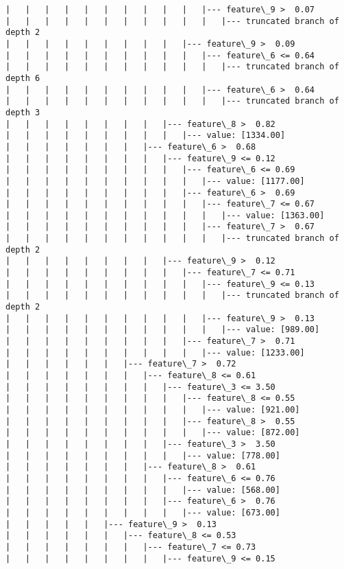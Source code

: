 \documentclass[11pt]{article}
\begin{document}
\begin{Verbatim}[commandchars=\\\{\}]
|   |   |   |   |   |   |   |   |   |   |--- feature\_9 >  0.07
|   |   |   |   |   |   |   |   |   |   |   |--- truncated branch of depth 2
|   |   |   |   |   |   |   |   |   |--- feature\_9 >  0.09
|   |   |   |   |   |   |   |   |   |   |--- feature\_6 <= 0.64
|   |   |   |   |   |   |   |   |   |   |   |--- truncated branch of depth 6
|   |   |   |   |   |   |   |   |   |   |--- feature\_6 >  0.64
|   |   |   |   |   |   |   |   |   |   |   |--- truncated branch of depth 3
|   |   |   |   |   |   |   |   |--- feature\_8 >  0.82
|   |   |   |   |   |   |   |   |   |--- value: [1334.00]
|   |   |   |   |   |   |   |--- feature\_6 >  0.68
|   |   |   |   |   |   |   |   |--- feature\_9 <= 0.12
|   |   |   |   |   |   |   |   |   |--- feature\_6 <= 0.69
|   |   |   |   |   |   |   |   |   |   |--- value: [1177.00]
|   |   |   |   |   |   |   |   |   |--- feature\_6 >  0.69
|   |   |   |   |   |   |   |   |   |   |--- feature\_7 <= 0.67
|   |   |   |   |   |   |   |   |   |   |   |--- value: [1363.00]
|   |   |   |   |   |   |   |   |   |   |--- feature\_7 >  0.67
|   |   |   |   |   |   |   |   |   |   |   |--- truncated branch of depth 2
|   |   |   |   |   |   |   |   |--- feature\_9 >  0.12
|   |   |   |   |   |   |   |   |   |--- feature\_7 <= 0.71
|   |   |   |   |   |   |   |   |   |   |--- feature\_9 <= 0.13
|   |   |   |   |   |   |   |   |   |   |   |--- truncated branch of depth 2
|   |   |   |   |   |   |   |   |   |   |--- feature\_9 >  0.13
|   |   |   |   |   |   |   |   |   |   |   |--- value: [989.00]
|   |   |   |   |   |   |   |   |   |--- feature\_7 >  0.71
|   |   |   |   |   |   |   |   |   |   |--- value: [1233.00]
|   |   |   |   |   |   |--- feature\_7 >  0.72
|   |   |   |   |   |   |   |--- feature\_8 <= 0.61
|   |   |   |   |   |   |   |   |--- feature\_3 <= 3.50
|   |   |   |   |   |   |   |   |   |--- feature\_8 <= 0.55
|   |   |   |   |   |   |   |   |   |   |--- value: [921.00]
|   |   |   |   |   |   |   |   |   |--- feature\_8 >  0.55
|   |   |   |   |   |   |   |   |   |   |--- value: [872.00]
|   |   |   |   |   |   |   |   |--- feature\_3 >  3.50
|   |   |   |   |   |   |   |   |   |--- value: [778.00]
|   |   |   |   |   |   |   |--- feature\_8 >  0.61
|   |   |   |   |   |   |   |   |--- feature\_6 <= 0.76
|   |   |   |   |   |   |   |   |   |--- value: [568.00]
|   |   |   |   |   |   |   |   |--- feature\_6 >  0.76
|   |   |   |   |   |   |   |   |   |--- value: [673.00]
|   |   |   |   |   |--- feature\_9 >  0.13
|   |   |   |   |   |   |--- feature\_8 <= 0.53
|   |   |   |   |   |   |   |--- feature\_7 <= 0.73
|   |   |   |   |   |   |   |   |--- feature\_9 <= 0.15

\end{Verbatim}
\end{document}
